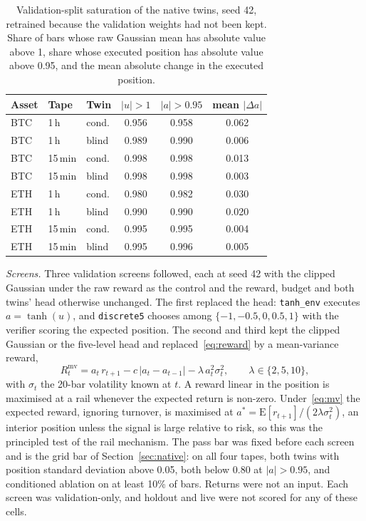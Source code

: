 \documentclass[conference]{IEEEtran}
\begin{document}
\begin{table}[!htb]
\caption{Validation-split saturation of the native twins, seed 42, retrained because the validation weights had not been kept. Share of bars whose raw Gaussian mean has absolute value above 1, share whose executed position has absolute value above 0.95, and the mean absolute change in the executed position.}
\label{tab:sat}
\centering
\footnotesize
\setlength{\tabcolsep}{3pt}
\begin{tabular}{@{}ll l ccc@{}}
\toprule
Asset & Tape & Twin & $|u|>1$ & $|a|>0.95$ & mean $|\Delta a|$\\
\midrule
BTC & 1\,h & cond. & 0.956 & 0.958 & 0.062\\
BTC & 1\,h & blind & 0.989 & 0.990 & 0.006\\
BTC & 15\,min & cond. & 0.998 & 0.998 & 0.013\\
BTC & 15\,min & blind & 0.998 & 0.998 & 0.003\\
ETH & 1\,h & cond. & 0.980 & 0.982 & 0.030\\
ETH & 1\,h & blind & 0.990 & 0.990 & 0.020\\
ETH & 15\,min & cond. & 0.995 & 0.995 & 0.004\\
ETH & 15\,min & blind & 0.995 & 0.996 & 0.005\\
\bottomrule
\end{tabular}
\end{table}

\emph{Screens.} Three validation screens followed, each at seed 42 with the clipped Gaussian under the raw reward as the control and the reward, budget and both twins' head otherwise unchanged. The first replaced the head: \texttt{tanh\_env} executes $a=\tanh(u)$, and \texttt{discrete5} chooses among $\{-1,-0.5,0,0.5,1\}$ with the verifier scoring the expected position. The second and third kept the clipped Gaussian or the five-level head and replaced~\eqref{eq:reward} by a mean-variance reward,
\begin{equation}
R^{\text{mv}}_t=a_t\,r_{t+1}-c\,\lvert a_t-a_{t-1}\rvert-\lambda\,a_t^2\sigma_t^2,\qquad \lambda\in\{2,5,10\},
\label{eq:mv}
\end{equation}
with $\sigma_t$ the 20-bar volatility known at $t$. A reward linear in the position is maximised at a rail whenever the expected return is non-zero. Under~\eqref{eq:mv} the expected reward, ignoring turnover, is maximised at $a^*=\mathrm{E}[r_{t+1}]/(2\lambda\sigma_t^2)$, an interior position unless the signal is large relative to risk, so this was the principled test of the rail mechanism. The pass bar was fixed before each screen and is the grid bar of Section~\ref{sec:native}: on all four tapes, both twins with position standard deviation above 0.05, both below 0.80 at $|a|>0.95$, and conditioned ablation on at least 10\% of bars. Returns were not an input. Each screen was validation-only, and holdout and live were not scored for any of these cells.
\end{document}
